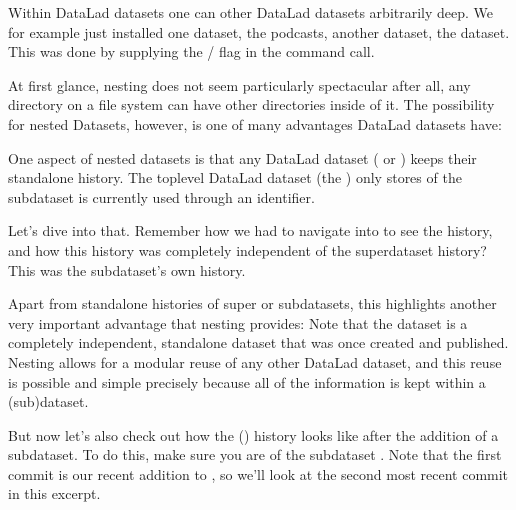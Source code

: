 \sphinxAtStartPar
Within DataLad datasets one can  other DataLad
datasets arbitrarily deep. We for example just installed one dataset, the
 podcasts,  another dataset, the  dataset.
This was done by supplying the / flag in the command call.

\sphinxAtStartPar
At first glance, nesting does not seem particularly spectacular \textendash{}
after all, any directory on a file system can have other directories inside of it.
The possibility for nested Datasets, however, is one of many advantages
DataLad datasets have:

\sphinxAtStartPar
One aspect of nested datasets is that any DataLad dataset
( or ) keeps their stand\sphinxhyphen{}alone
history. The top\sphinxhyphen{}level DataLad dataset (the ) only stores
 of the subdataset is currently used through an identifier.

\sphinxAtStartPar
Let’s dive into that.
Remember how we had to navigate into  to see the history,
and how this history was completely independent of the 
superdataset history? This was the subdataset’s own history.

\sphinxAtStartPar
Apart from stand\sphinxhyphen{}alone histories of super\sphinxhyphen{} or subdatasets, this highlights another
very important advantage that nesting provides: Note that the  dataset
is a completely independent, standalone dataset that was once created and
published. Nesting allows for a modular reuse of any other DataLad dataset,
and this reuse is possible and simple precisely because all of the information
is kept within a (sub)dataset.

\sphinxAtStartPar
But now let’s also check out how the  () history
looks like after the addition of a subdataset. To do this, make sure you are
 of the subdataset . Note that the first commit is our recent
addition to , so we’ll look at the second most recent commit in
this excerpt.

